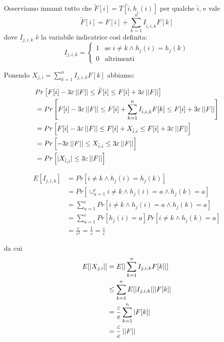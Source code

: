 \begin{proof*}
    Osserviamo innanzi tutto che $\tilde{F}[i] = T[\hat{i}, h_{\hat{i}}(i)]$
    per qualche $\hat{i}$, e vale
    \[
        \tilde{F}[i] = F[i] + \sum_{k = 1}^{n}I_{\hat{i}, i, k}F[k]
    \]
    dove $I_{j, i, k}$ è la variabile indicatrice così definita:
    \[
        I_{j, i, k} =
        \begin{cases}
            1 & \mbox{se } i \neq k \land h_j(i)=h_j(k) \\
            0 & \mbox{altrimenti}
        \end{cases}
    \]

    Ponendo $X_{j, i} = \sum_{k=1}^n I_{j, i, k} F[k]$ abbiamo:
    
    \begin{align}
        & Pr\left[F[i] - 3\varepsilon\left|\left|F\right|\right| \le \tilde{F}[i]
            \le F[i] + 3\varepsilon\left|\left|F\right|\right|\right] \nonumber \\
        &= Pr\left[F[i] - 3\varepsilon\left|\left|F\right|\right|
            \le F[i] + \sum_{k = 1}^{n}I_{\hat{i}, i, k}F[k]
            \le F[i] + 3\varepsilon\left|\left|F\right|\right|\right] \nonumber \\
        &= Pr\left[F[i] - 3\varepsilon\left|\left|F\right|\right|
            \le F[i] + X_{\hat{i},i}
            \le F[i] + 3\varepsilon\left|\left|F\right|\right|\right] \nonumber \\
        &= Pr\left[- 3\varepsilon\left|\left|F\right|\right|
            \le X_{\hat{i},i}
            \le 3\varepsilon\left|\left|F\right|\right|\right] \nonumber \\
        &= Pr\left[|X_{\hat{i},i}| \le 3\varepsilon\left|\left|F\right|\right|\right] \nonumber
    \end{align}

    \begin{align}
        E[I_{j, i, k}] &= Pr\left[i \neq k \land h_j(i) = h_j(k)\right] \nonumber \\
        &= Pr\left[\cup_{a=1}^c i \neq k \land h_j(i) = a \land h_j(k) = a \right] \nonumber \\
        &= \sum_{a=1}^c Pr\left[i \neq k \land h_j(i) = a \land h_j(k) = a \right] \nonumber \\
        &= \sum_{a=1}^c Pr\left[h_j(i) = a\right]Pr\left[i \neq k \land h_j(k) = a \right] \nonumber \\
        &= \frac{c}{c^2} = \frac{1}{c} = \frac{\varepsilon}{e} \nonumber
    \end{align}

    da cui
    \begin{align}
        E[|X_{j, i}|] &= E[|\sum_{k=1}^n I_{j, i, k} F[k]|] \nonumber \\
        &\le \sum_{k=1}^n E[|I_{j, i, k}|] |F[k]| \nonumber \\
        &= \frac{\varepsilon}{e} \sum_{k=1}^n |F[k]| \nonumber \\
        &= \frac{\varepsilon}{e} \left|\left|F\right|\right| \nonumber
    \end{align}


\end{proof*}
